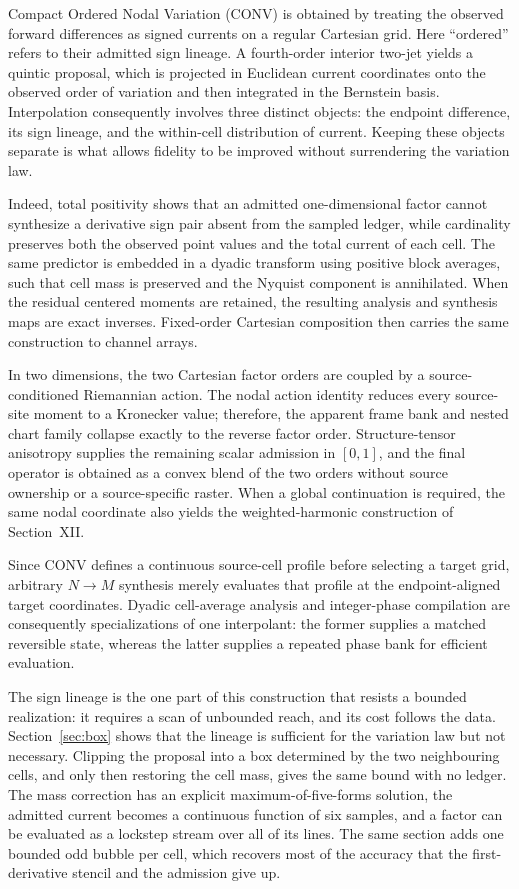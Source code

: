 \documentclass[journal]{IEEEtran}
\begin{document}
Compact Ordered Nodal Variation (CONV) is obtained by treating the observed
forward differences as signed currents on a regular Cartesian grid. Here
``ordered'' refers to their admitted sign lineage. A fourth-order interior
two-jet yields a quintic proposal, which is projected in Euclidean current
coordinates onto the observed order of variation and then integrated in the
Bernstein basis. Interpolation consequently involves three distinct objects:
the endpoint difference, its sign lineage, and the within-cell distribution
of current. Keeping these objects separate is what allows fidelity to be
improved without surrendering the variation law.

Indeed, total positivity shows that an admitted one-dimensional factor cannot
synthesize a derivative sign pair absent from the sampled ledger, while
cardinality preserves both the observed point values and the total current of
each cell. The same predictor is embedded in a dyadic transform using positive
block averages, such that cell mass is preserved and the Nyquist component is
annihilated. When the residual centered moments are retained, the resulting
analysis and synthesis maps are exact inverses. Fixed-order Cartesian
composition then carries the same construction to channel arrays.

In two dimensions, the two Cartesian factor orders are coupled by a
source-conditioned Riemannian action. The nodal action identity reduces every
source-site moment to a Kronecker value; therefore, the apparent frame bank
and nested chart family collapse exactly to the reverse factor order.
Structure-tensor anisotropy supplies the remaining scalar admission in
\([0,1]\), and the final operator is obtained as a convex blend of the two
orders without source ownership or a source-specific raster. When a global
continuation is required, the same nodal coordinate also yields the
weighted-harmonic construction of Section~XII.

Since CONV defines a continuous source-cell profile before selecting a target
grid, arbitrary \(N\to M\) synthesis merely evaluates that profile at the
endpoint-aligned target coordinates. Dyadic cell-average analysis and
integer-phase compilation are consequently specializations of one
interpolant: the former supplies a matched reversible state, whereas the
latter supplies a repeated phase bank for efficient evaluation.

The sign lineage is the one part of this construction that resists a
bounded realization: it requires a scan of unbounded reach, and its cost
follows the data. Section~\ref{sec:box} shows that the lineage is
sufficient for the variation law but not necessary. Clipping the
proposal into a box determined by the two neighbouring cells, and only
then restoring the cell mass, gives the same bound with no ledger. The
mass correction has an explicit maximum-of-five-forms solution, the
admitted current becomes a continuous function of six samples, and a
factor can be evaluated as a lockstep stream over all of its lines. The
same section adds one bounded odd bubble per cell, which recovers most
of the accuracy that the first-derivative stencil and the admission
give up.
\end{document}
